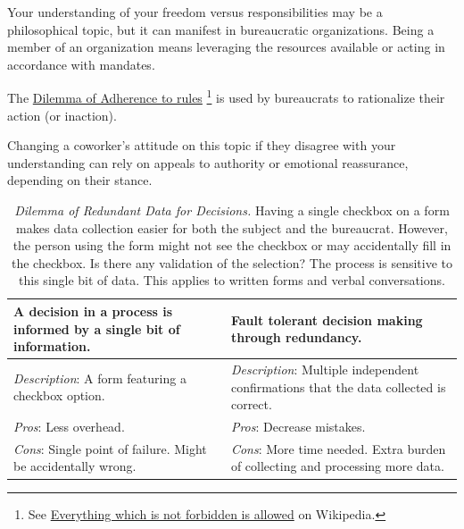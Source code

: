 Your understanding of your freedom versus responsibilities may be a philosophical topic, but it can manifest in bureaucratic organizations. Being a member of an organization means leveraging the resources available or acting in accordance with mandates. 


The \hyperref[table:dilemma-personal-rule-adherence]{Dilemma of Adherence to rules}
\footnote{See \href{https://en.wikipedia.org/wiki/Everything_which_is_not_forbidden_is_allowed}{Everything which is not forbidden is allowed} 
on Wikipedia.} is used by bureaucrats to rationalize their action (or inaction). 

Changing a coworker's attitude on this topic if they disagree with your understanding can rely on appeals to authority or emotional reassurance, depending on their stance.


\begin{center}
\begin{table}[H] %
\begin{tabular}{ | m{\dilemmatablewidth}| m{\dilemmatablewidth} | } 
  \hline
  \textbf{A decision in a process is informed by a single bit of information.} & 
  \textbf{Fault tolerant decision making through redundancy.} \\ 
  \hline
  \textit{Description}: A form featuring a checkbox option. & 
  \textit{Description}: Multiple independent confirmations that the data collected is correct.  \\
  \hline
  \textit{Pros}: Less overhead. & 
  \textit{Pros}: Decrease mistakes. \\
  \hline
  \textit{Cons}: Single point of failure. Might be accidentally wrong. &
  \textit{Cons}: More time needed. Extra burden of collecting and processing more data. \\  
  \hline
\end{tabular}
\caption{
\textit{Dilemma of Redundant Data for Decisions.}
Having a single checkbox on a form makes data collection easier for both the subject and the bureaucrat. However, the person using the form might not see the checkbox or may accidentally fill in the checkbox. Is there any validation of the selection? The process is sensitive to this single bit of data. This applies to written forms and verbal conversations. 
}
\label{table:dilemma-personal-single-bit-decision}
\end{table}
\end{center}

